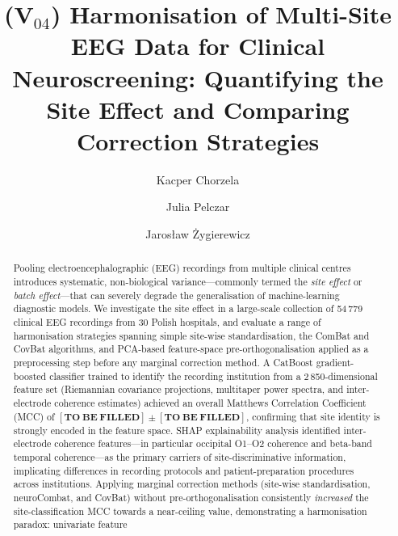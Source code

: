 \documentclass[preprint,12pt]{elsarticle}
\begin{document}
\begin{frontmatter}

\title{(V$_{04}$) Harmonisation of Multi-Site EEG Data for Clinical Neuroscreening:
       Quantifying the Site Effect and Comparing Correction Strategies}

\author[aff1]{Kacper Chorzela}
\author[aff1]{Julia Pelczar}
\author[aff1]{Jaros\l{}aw {\.Z}ygierewicz}



\begin{abstract}
Pooling electroencephalographic (EEG) recordings from multiple clinical
centres introduces systematic, non-biological variance---commonly
termed the \emph{site effect} or \emph{batch effect}---that can
severely degrade the generalisation of machine-learning diagnostic
models.
We investigate the site effect in a large-scale
collection of 54\,779 clinical EEG recordings from 30 Polish hospitals,
and evaluate a range of harmonisation strategies spanning simple
site-wise standardisation, the ComBat and CovBat algorithms, and
PCA-based feature-space pre-orthogonalisation applied as a
preprocessing step before any marginal correction method.
A CatBoost gradient-boosted classifier trained to identify the
recording institution from a 2\,850-dimensional feature set
(Riemannian covariance projections, multitaper power spectra, and
inter-electrode coherence estimates) achieved an overall
Matthews Correlation Coefficient (MCC) of $\mathbf{[TO\ BE\ FILLED]}
\pm \mathbf{[TO\ BE\ FILLED]}$, confirming that site identity is
strongly encoded in the feature space.
SHAP explainability analysis identified inter-electrode coherence
features---in particular occipital O1--O2 coherence and beta-band
temporal coherence---as the primary carriers of site-discriminative
information, implicating differences in recording protocols and
patient-preparation procedures across institutions.
Applying marginal correction methods (site-wise standardisation,
neuroCombat, and CovBat) without pre-orthogonalisation consistently
\emph{increased} the site-classification MCC towards a near-ceiling
value, demonstrating a harmonisation paradox: univariate feature

\end{abstract}
\end{frontmatter}
\end{document}
